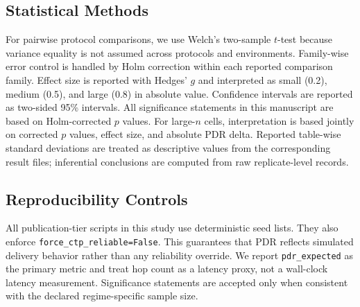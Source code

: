 \documentclass[sensors,article,submit,moreauthors,pdftex]{Definitions/mdpi}
\begin{document}
\begin{table}[H]
\caption{Evidence-regime map used in this manuscript.}
\label{tab:regime_map}
\centering
{}
\end{table}

\subsection{Statistical Methods}
For pairwise protocol comparisons, we use Welch's two-sample $t$-test because variance equality is not assumed across protocols and environments. Family-wise error control is handled by Holm correction within each reported comparison family. Effect size is reported with Hedges' $g$ and interpreted as small (0.2), medium (0.5), and large (0.8) in absolute value. Confidence intervals are reported as two-sided 95\% intervals. All significance statements in this manuscript are based on Holm-corrected $p$ values. For large-$n$ cells, interpretation is based jointly on corrected $p$ values, effect size, and absolute PDR delta. Reported table-wise standard deviations are treated as descriptive values from the corresponding result files; inferential conclusions are computed from raw replicate-level records.

\subsection{Reproducibility Controls}
All publication-tier scripts in this study use deterministic seed lists. They also enforce \texttt{force\_ctp\_reliable=False}. This guarantees that PDR reflects simulated delivery behavior rather than any reliability override. We report \texttt{pdr\_expected} as the primary metric and treat hop count as a latency proxy, not a wall-clock latency measurement. Significance statements are accepted only when consistent with the declared regime-specific sample size.
\end{document}
